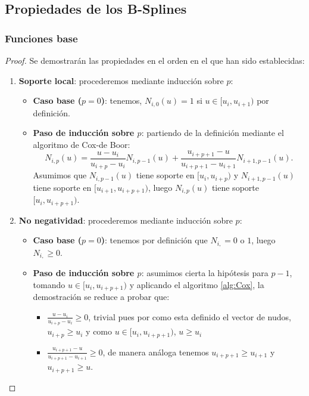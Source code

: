 \documentclass[11pt]{book}
\theoremstyle{plain} %
\theoremstyle{definition} %
\theoremstyle{definition} %
\begin{document}
\subsection{Propiedades de los B-Splines}
\label{sec:B-Splines_proof}
\subsubsection{Funciones base}
\begin{proof} Se demostrarán las propiedades en el orden en el que han sido establecidas:


    \begin{enumerate}
        \item \textbf{Soporte local}: procederemos mediante inducción sobre $p$:
            \begin{itemize}
                \item \textbf{Caso base ($p=0$)}: tenemos, $N_{i,0}(u)=1$ si $u\in [u_i, u_{i+1})$ por definición.
                \item \textbf{Paso de inducción sobre $p$}: partiendo de la definición mediante el algoritmo de Cox-de Boor:
                \begin{equation}
                    N_{i,p}(u) = \frac{u - u_i}{u_{i+p} - u_i} N_{i,p-1}(u) + \frac{u_{i+p+1} - u}{u_{i+p+1} - u_{i+1}} N_{i+1,p-1}(u).
                    \label{alg:Cox}
                \end{equation}
                Asumimos que $N_{i,p-1}(u)$ tiene soporte en $[u_i, u_{i+p})$ y $N_{i+1,p-1}(u)$ tiene soporte en $[u_{i+1}, u_{i+p+1})$, luego $N_{i,p}(u)$ tiene soporte $[u_{i}, u_{i+p+1})$.
            \end{itemize}
            \item \textbf{No negatividad}: procederemos mediante inducción sobre $p$:
            \begin{itemize}
                \item \textbf{Caso base ($p=0$)}: tenemos por definición que $N_{i,}=0$ o $1$, luego $N_{i,} \geq 0$.
                \item \textbf{Paso de inducción sobre $p$}: asumimos cierta la hipótesis para $p-1$, tomando $u \in [u_i, u_{i+p+1})$ y aplicando el algoritmo \ref{alg:Cox}, la demostración se reduce a probar que:
                \begin{itemize}
                    \item $\frac{u - u_i}{u_{i+p} - u_i}\geq 0$, trivial pues por como esta definido el vector de nudos, $u_{i+p} \geq u_i$ y como $u \in [u_i, u_{i+p+1})$, $u \geq u_i$
                    \item $\frac{u_{i+p+1} - u}{u_{i+p+1} - u_{i+1}}\geq 0$, de manera análoga tenemos $u_{i+p+1} \geq u_{i+1}$ y $u_{i+p+1}\geq u$.
                \end{itemize}
            

\end{itemize}
\end{enumerate}
\end{proof}
\end{document}
